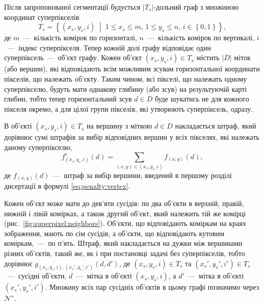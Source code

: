 Після запропонованої сегментації будується
$\left| T_s \right|$-дольний граф з множиною координат суперпікселів
\begin{equation*}
    T_s = \left\{
        \left(x_s, y_s, i \right) \; \middle| \;
        1 \le x_s \le m, \,
        1 \le y_s \le n, \,
        i \in \left\{ 0, 1 \right\}
    \right\},
\end{equation*}
де $m$~---~кількість комірок по горизонталі,
$n$~---~кількість комірок по вертикалі,
$i$~---~індекс суперпікселя.
Тепер кожній долі графу відповідає один суперпіксель~---~об'єкт графу.
Кожен об'єкт $\left(x_s, y_s, i \right) \in T_s$ містить
$ \left| D \right|$ міток (або вершин),
які відповідають всім можливим зсувам горизонтальної координати пікселів,
що належать об'єкту.
Таким чином, всі пікселі, що належать одному суперпікселю,
будуть мати однакову глибину (або зсув) на результуючій карті глибин,
тобто тепер горизонтальний зсув $d \in D$
буде шукатись не для кожного пікселя окремо, а для цілої групи пікселів,
які утворюють суперпіксель, одразу.

В об'єкті $\left(x_s, y_s, i \right) \in T_s$ на вершину з міткою $d \in D$
накладається штраф,
який дорівнює сумі штрафів за вибір відповідних вершин у всіх пікселях,
які належать даному суперпікселю,
\begin{equation*}
    f_{\left(x_s, y_s, i\right)}^s \left( d \right) =
    \sum \limits_{\left(x, y \right) \in \left(x_s, y_s, i \right)}
        f_{\left(x, y \right)} \left( d \right),
\end{equation*}
де $f_{\left(x, y \right)} \left( d \right)$~---~штраф за вибір вершини,
введений в першому розділі дисертації в формулі \eqref{eq:penalty:vertex}.

Кожен об'єкт може мати до дев'яти сусідів: по два об'єкти в верхній, правій,
нижній і лівій комірках, а також другий об'єкт,
який належить тій же комірці (рис.~\ref{fig:superpixel:neighbors}).
Об'єкти, що відповідають коміркам на краях зображення, мають по сім сусідів,
а об'єкти, що відповідають кутовим коміркам,~---~по п'ять.
Штраф, який накладається на дужки між вершинами різних об'єктів, такий же,
як і при постановці задачі без суперпікселів, тобто дорівнює
$g_{\left(x_s, y_s, i \right), \left(x_s', y_s', i' \right)}
    \left(d, d' \right)$,
де $\left(x_s, y_s, i \right) \in T_s$ та
$\left(x_s', y_s', i' \right) \in T_s$~---~сусідні об'єкти,
$d$~---~мітка в об'єкті $\left(x_s, y_s, i \right)$,
а $d'$~---~мітка в об'єкті $\left(x_s', y_s', i' \right)$.
Множину всіх пар сусідніх об'єктів в цьому графі позначимо через $\mathcal{N}^s$.


